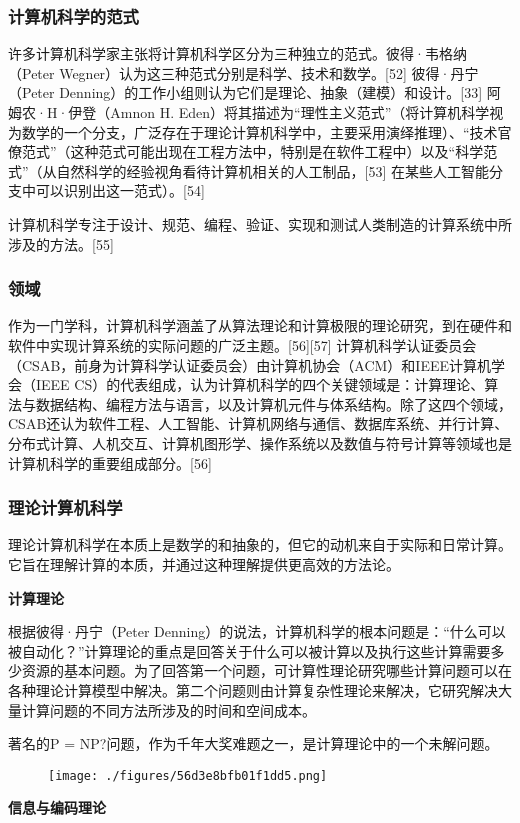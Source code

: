 \subsubsection{计算机科学的范式}  
许多计算机科学家主张将计算机科学区分为三种独立的范式。彼得·韦格纳（Peter Wegner）认为这三种范式分别是科学、技术和数学。[52] 彼得·丹宁（Peter Denning）的工作小组则认为它们是理论、抽象（建模）和设计。[33] 阿姆农·H·伊登（Amnon H. Eden）将其描述为“理性主义范式”（将计算机科学视为数学的一个分支，广泛存在于理论计算机科学中，主要采用演绎推理）、“技术官僚范式”（这种范式可能出现在工程方法中，特别是在软件工程中）以及“科学范式”（从自然科学的经验视角看待计算机相关的人工制品，[53] 在某些人工智能分支中可以识别出这一范式）。[54]  

计算机科学专注于设计、规范、编程、验证、实现和测试人类制造的计算系统中所涉及的方法。[55]
\subsubsection{领域}  
作为一门学科，计算机科学涵盖了从算法理论和计算极限的理论研究，到在硬件和软件中实现计算系统的实际问题的广泛主题。[56][57] 计算机科学认证委员会（CSAB，前身为计算科学认证委员会）由计算机协会（ACM）和IEEE计算机学会（IEEE CS）的代表组成，认为计算机科学的四个关键领域是：计算理论、算法与数据结构、编程方法与语言，以及计算机元件与体系结构。除了这四个领域，CSAB还认为软件工程、人工智能、计算机网络与通信、数据库系统、并行计算、分布式计算、人机交互、计算机图形学、操作系统以及数值与符号计算等领域也是计算机科学的重要组成部分。[56]
\subsubsection{理论计算机科学}   
理论计算机科学在本质上是数学的和抽象的，但它的动机来自于实际和日常计算。它旨在理解计算的本质，并通过这种理解提供更高效的方法论。

\textbf{计算理论}  
 
根据彼得·丹宁（Peter Denning）的说法，计算机科学的根本问题是：“什么可以被自动化？”计算理论的重点是回答关于什么可以被计算以及执行这些计算需要多少资源的基本问题。为了回答第一个问题，可计算性理论研究哪些计算问题可以在各种理论计算模型中解决。第二个问题则由计算复杂性理论来解决，它研究解决大量计算问题的不同方法所涉及的时间和空间成本。

著名的P = NP?问题，作为千年大奖难题之一，是计算理论中的一个未解问题。
\begin{figure}[ht]
\centering
\texttt{[image: ./figures/56d3e8bfb01f1dd5.png]}
\caption{} \label{fig_JSS_4}
\end{figure}
\textbf{信息与编码理论}  

